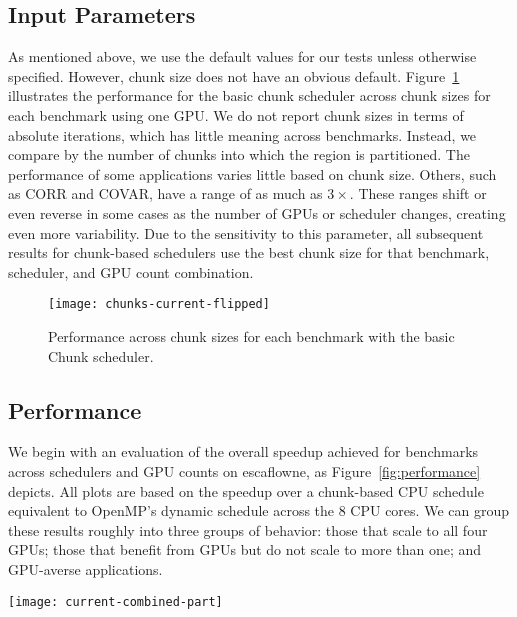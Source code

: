 \subsection{Input Parameters}

As mentioned above, we use the default values for our tests unless otherwise
specified. However, chunk size does not have an obvious default.
Figure~\ref{fig:chunk-size} illustrates the performance for the basic chunk
scheduler across chunk sizes for each benchmark using one GPU. We do not
report chunk sizes in terms of absolute iterations, which has little meaning
across benchmarks. Instead, we compare by the number of chunks into which the
region is partitioned. The performance of some applications varies little
based on chunk size. Others, such as CORR and COVAR, have a range of as much as
$3\times$. These ranges shift or even reverse in some cases as the number of
GPUs or scheduler changes, creating even more variability. Due to the
sensitivity to this parameter, all subsequent results for chunk-based
schedulers use the best chunk size for that benchmark, scheduler, and GPU
count combination.

\begin{figure}[t]
        \texttt{[image: chunks-current-flipped]}
        \caption{Performance across chunk sizes for each benchmark with the
        basic Chunk scheduler.\label{fig:chunk-size}}
\end{figure}



\subsection{\tsar Performance}
\label{sec:orig}

We begin with an evaluation of the overall speedup achieved for benchmarks
across schedulers and GPU counts on escaflowne, as
Figure~\ref{fig:performance} depicts.  All plots are based on the speedup over
a chunk-based CPU schedule equivalent to OpenMP's dynamic schedule across the 8
CPU cores. We can group these results roughly into three groups of behavior:
those that scale to all four GPUs; those that benefit from GPUs but do not
scale to more than one; and GPU-averse applications.


\begin{figure*}[p]
        \texttt{[image: current-combined-part]}
        \caption{Performance across schedulers and number of GPUs for all
        benchmarks, normalized to CPU OpenMP across 8 cores.\label{fig:performance}}
\end{figure*}

